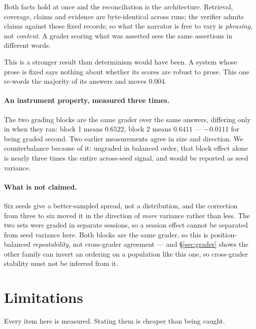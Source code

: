 \documentclass{article}
\newcommand{\expref}[1]{\iftoggle{trace}{\,{\scriptsize\textcolor{gray}{\texttt{[#1]}}}}{}}
\begin{document}
Both facts hold at once and the reconciliation is the architecture. Retrieval,
coverage, claims and evidence are byte-identical across runs; the verifier
admits claims against those fixed records; so what the narrator is free to vary
is \emph{phrasing}, not \emph{content}. A grader scoring what was asserted sees
the same assertions in different words.

This is a stronger result than determinism would have been. A system whose prose
is fixed says nothing about whether its scores are robust to prose. This one
re-words the majority of its answers and moves $0.004$.

\paragraph{An instrument property, measured three times.} The two grading blocks
are the same grader over the same answers, differing only in when they ran:
block 1 means $0.6522$, block 2 means $0.6411$ --- $-0.0111$ for being graded
second.\expref{EXP-2026-09-011} Two earlier measurements agree in size and
direction.\expref{EXP-2026-08-022}\expref{EXP-2026-09-009} We counterbalance
because of it: ungraded in balanced order, that block effect alone is nearly
three times the entire across-seed signal, and would be reported as seed
variance.

\paragraph{What is not claimed.} Six seeds give a better-sampled spread, not a
distribution, and the correction from three to six moved it in the direction of
\emph{more} variance rather than less. The two sets were graded in separate
sessions, so a session effect cannot be separated from seed variance here.
Both blocks are the same grader, so this is position-balanced \emph{repeatability},
not cross-grader agreement --- and \S\ref{sec:grader} shows the other family can
invert an ordering on a population like this one, so cross-grader stability
must not be inferred from it.

\section{Limitations}
\label{sec:limitations}

Every item here is measured. Stating them is cheaper than being caught.
\end{document}

